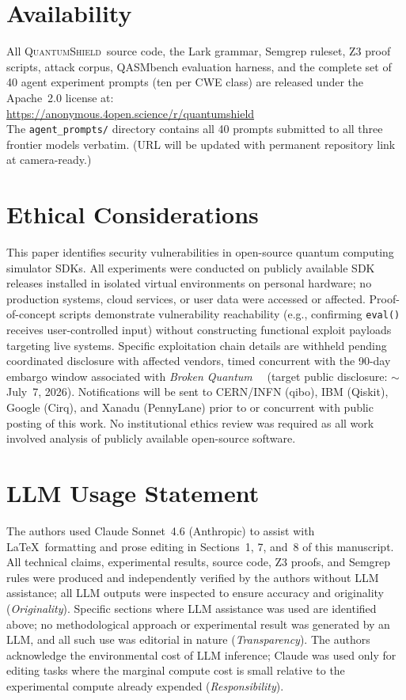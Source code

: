 \documentclass[conference,compsoc]{IEEEtran}
\newcommand{\tool}{\textsc{QuantumShield}}
\newcommand{\broken}{\textit{Broken Quantum}~\cite{blain2026broken}}
\begin{document}
\section*{Availability}
\noindent All \tool\ source code, the Lark grammar, Semgrep ruleset, Z3 proof
scripts, attack corpus, QASMbench evaluation harness, and the complete
set of 40 agent experiment prompts (ten per CWE class) are released
under the Apache~2.0 license at:\\
\url{https://anonymous.4open.science/r/quantumshield}\\
The \texttt{agent\_prompts/} directory contains all 40 prompts submitted
to all three frontier models verbatim.
(URL will be updated with permanent repository link at camera-ready.)

\section*{Ethical Considerations}
\noindent This paper identifies security vulnerabilities in open-source quantum
computing simulator SDKs.
All experiments were conducted on publicly available SDK releases
installed in isolated virtual environments on personal hardware; no
production systems, cloud services, or user data were accessed or affected.
Proof-of-concept scripts demonstrate vulnerability reachability (e.g.,
confirming \texttt{eval()} receives user-controlled input) without
constructing functional exploit payloads targeting live systems.
Specific exploitation chain details are withheld pending coordinated
disclosure with affected vendors, timed concurrent with the 90-day
embargo window associated with \broken~\cite{blain2026broken}
(target public disclosure: $\sim$July~7, 2026).
Notifications will be sent to CERN/INFN (qibo), IBM (Qiskit),
Google (Cirq), and Xanadu (PennyLane) prior to or concurrent with
public posting of this work.
No institutional ethics review was required as all work involved
analysis of publicly available open-source software.

\section*{LLM Usage Statement}
\noindent The authors used Claude Sonnet~4.6 (Anthropic) to assist with
\LaTeX\ formatting and prose editing in Sections~1, 7, and~8 of this
manuscript.
All technical claims, experimental results, source code, Z3 proofs,
and Semgrep rules were produced and independently verified by the
authors without LLM assistance; all LLM outputs were inspected
to ensure accuracy and originality (\textit{Originality}).
Specific sections where LLM assistance was used are identified above;
no methodological approach or experimental result was generated by
an LLM, and all such use was editorial in nature (\textit{Transparency}).
The authors acknowledge the environmental cost of LLM inference;
Claude was used only for editing tasks where the marginal compute
cost is small relative to the experimental compute already expended
(\textit{Responsibility}).
\end{document}
